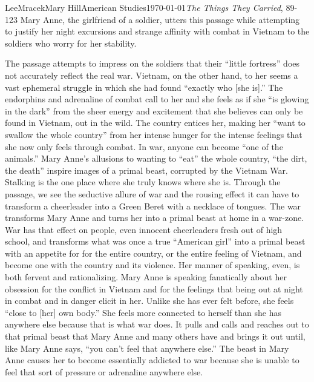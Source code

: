 \documentclass[letterpaper, 11pt]{article}
\begin{document}
\begin{mla}{Lee}{Mracek}{Mary Hill}{American Studies}{\today}{\textit{The Things They Carried}, 89-123}
Mary Anne, the girlfriend of a soldier, utters this passage while attempting to justify her night excursions and strange affinity with combat in Vietnam to the soldiers who worry for her stability.

The passage attempts to impress on the soldiers that their ``little fortress'' does not accurately reflect the real war. Vietnam, on the other hand, to her seems a vast ephemeral struggle in which she had found ``exactly who [she is].'' The endorphins and adrenaline of combat call to her and she feels as if she ``is glowing in the dark'' from the sheer energy and excitement that she believes can only be found in Vietnam, out in the wild. The country entices her, making her ``want to swallow the whole country'' from her intense hunger for the intense feelings that she now only feels through combat. In war, anyone can become ``one of the animals.'' Mary Anne's allusions to wanting to ``eat'' the whole country, ``the dirt, the death'' inspire images of a primal beast, corrupted by the Vietnam War. Stalking is the one place where she truly knows where she is. Through the passage, we see the seductive allure of war and the rousing effect it can have to transform a cheerleader into a Green Beret with a necklace of tongues. The war transforms Mary Anne and turns her into a primal beast at home in a war-zone. War has that effect on people, even innocent cheerleaders fresh out of high school, and transforms what was once a true ``American girl'' into a primal beast with an appetite for for the entire country, or the entire feeling of Vietnam, and become one with the country and its violence. %
Her manner of speaking, even, is both fervent and rationalizing. Mary Anne is speaking fanatically about her obsession for the conflict in Vietnam and for the feelings that being out at night in combat and in danger elicit in her. Unlike she has ever felt before, she feels ``close to [her] own body.'' She feels more connected to herself than she has anywhere else because that is what war does. It pulls and calls and reaches out to that primal beast that Mary Anne and many others have and brings it out until, like Mary Anne says, ``you can't feel that anywhere else.'' The beast in Mary Anne causes her to become essentially addicted to war because she is unable to feel that sort of pressure or adrenaline anywhere else.
\end{mla}
\end{document}
